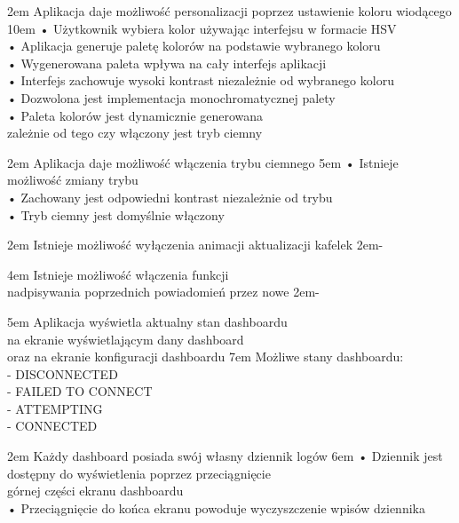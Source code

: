 {2em}{
    Aplikacja daje możliwość personalizacji poprzez ustawienie koloru wiodącego
}
{10em}{
    • Użytkownik wybiera kolor używając interfejsu w formacie HSV\\
    • Aplikacja generuje paletę kolorów na podstawie wybranego koloru\\
    • Wygenerowana paleta wpływa na cały interfejs aplikacji\\
    • Interfejs zachowuje wysoki kontrast niezależnie od wybranego koloru\\
    • Dozwolona jest implementacja monochromatycznej palety\\
    • Paleta kolorów jest dynamicznie generowana\\
    \hspace*{0.5em} zależnie od tego czy włączony jest tryb ciemny
}

{2em}{
    Aplikacja daje możliwość włączenia trybu ciemnego
}
{5em}{
    • Istnieje możliwość zmiany trybu\\
    • Zachowany jest odpowiedni kontrast niezależnie od trybu\\
    • Tryb ciemny jest domyślnie włączony
}

{2em}{
    Istnieje możliwość wyłączenia animacji aktualizacji kafelek
}
{2em}{-}

{4em}{
    Istnieje możliwość włączenia funkcji\\
    nadpisywania poprzednich powiadomień przez nowe
}
{2em}{-}

{5em}{
    Aplikacja wyświetla aktualny stan dashboardu\\
    na ekranie wyświetlającym dany dashboard\\
    oraz na ekranie konfiguracji dashboardu
}
{7em}{
    Możliwe stany dashboardu:\\
    - DISCONNECTED\\
    - FAILED TO CONNECT\\
    - ATTEMPTING\\
    - CONNECTED
}

{2em}{
    Każdy dashboard posiada swój własny dziennik logów
}
{6em}{
    • Dziennik jest dostępny do wyświetlenia poprzez przeciągnięcie\\
    \hspace*{0.5em} górnej części ekranu dashboardu\\

    • Przeciągnięcie do końca ekranu powoduje wyczyszczenie wpisów dziennika
}

